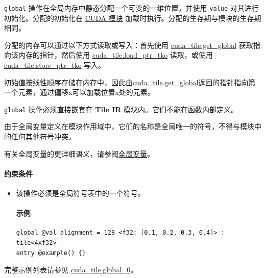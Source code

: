 \documentclass{article}
\begin{document}
\texttt{global} 操作在全局内存中静态分配一个可变的一维位置，并使用 \texttt{value} 对其进行初始化。分配的初始化在 \href{https://docs.nvidia.com/cuda/cuda-driver-api/group__CUDA__TYPES.html#group__CUDA__TYPES_1g9e4ef4dcfba4662b2299acb8d049a1ef}{CUDA 模块} 加载时执行。分配的生存期与模块的生存期相同。


分配的内存可以通过以下方式读取或写入：首先使用 \href{https://docs.nvidia.com/cuda/tile-ir/latest/sections/operations.html#op-cuda-tile-get-global}{cuda\_tile.get\_global} 获取指向该内存的指针，然后使用 \href{https://docs.nvidia.com/cuda/tile-ir/latest/sections/operations.html#op-cuda-tile-load-ptr-tko}{cuda\_tile.load\_ptr\_tko} 读取，或使用 \href{https://docs.nvidia.com/cuda/tile-ir/latest/sections/operations.html#op-cuda-tile-store-ptr-tko}{cuda\_tile.store\_ptr\_tko} 写入。


初始值按线性顺序存储在内存中，因此由\href{https://docs.nvidia.com/cuda/tile-ir/latest/sections/operations.html#op-cuda-tile-get-global}{cuda\_tile.get\_global}返回的指针指向第一个元素，通过偏移x可以加载位置x处的元素。


\texttt{global} 操作必须直接嵌套在 \textbf{Tile IR} 模块内。它们不能在函数内部定义。

由于全局变量定义在模块作用域中，它们的名称是全局唯一的符号，不得与模块中的任何其他符号冲突。


有关全局变量的更详细语义，请参阅\href{https://docs.nvidia.com/cuda/tile-ir/latest/sections/semantics.html#sub-sec-tile-global}{全局变量}。



\paragraph{约束条件}

\begin{itemize}
\item 该操作必须是全局符号表中的一个符号。


\paragraph{示例}

\begin{lstlisting}
global @val alignment = 128 <f32: [0.1, 0.2, 0.3, 0.4]> : tile<4xf32>
entry @example() {}
\end{lstlisting}

\end{itemize}
完整示例列表请参见 \href{https://docs.nvidia.com/cuda/tile-ir/latest/sections/appendix.html#example-cuda-tile-global-0}{cuda\_tile.global\_0}。
\end{document}
